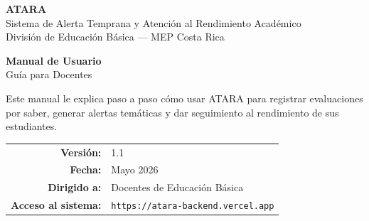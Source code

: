 \documentclass[12pt,a4paper,oneside]{article}
\begin{document}
\thispagestyle{empty}


\vspace*{1.8cm}

\begin{center}
  {\Huge\bfseries\color{white} ATARA}\\[0.5em]
  {\large\color{white!85!ataraAzul}
    Sistema de Alerta Temprana y Atención al Rendimiento Académico}\\[0.3em]
  {\normalsize\color{white!70!ataraAzul}
    División de Educación Básica — MEP Costa Rica}

  \vspace{2.5cm}

  {\Huge\bfseries\color{ataraAzul} Manual de Usuario}\\[0.6em]
  {\Large\color{ataraGris} Guía para Docentes}

  \vspace{1.5cm}

  \begin{tcolorbox}[
    width=0.80\linewidth,
    colback=ataraAzulPale,
    colframe=ataraAzul!40,
    arc=4mm, boxrule=0.8pt,
    halign=center]
  {\normalsize Este manual le explica paso a paso cómo usar ATARA
  para registrar evaluaciones por saber, generar alertas temáticas
  y dar seguimiento al rendimiento de sus estudiantes.}
  \end{tcolorbox}

  \vspace{2.5cm}

  \begin{tabular}{rl}
  \textbf{Versión:}          & 1.1 \\[0.3em]
  \textbf{Fecha:}            & Mayo 2026 \\[0.3em]
  \textbf{Dirigido a:}       & Docentes de Educación Básica \\[0.3em]
  \textbf{Acceso al sistema:}& \texttt{https://atara-backend.vercel.app} \\
  \end{tabular}
\end{center}

\newpage

\tableofcontents
\newpage
{}
\end{document}
